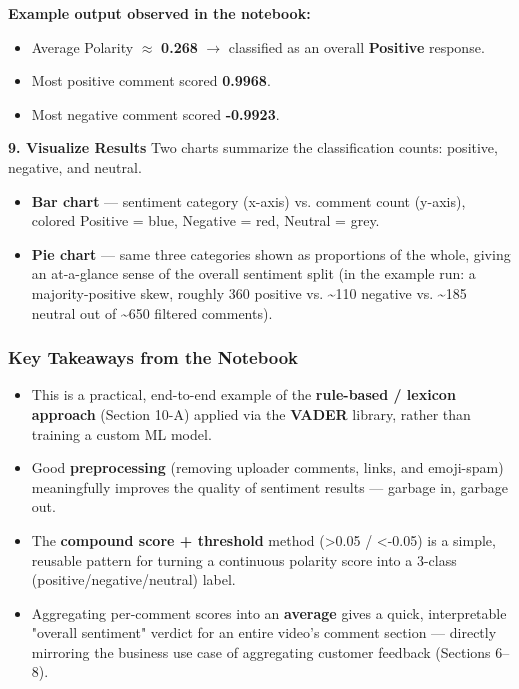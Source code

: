\documentclass[12pt,openany]{book}
\begin{document}
\textbf{Example output observed in the notebook:}
\begin{itemize}[leftmargin=*]
    \item Average Polarity \(\approx\) \textbf{0.268} \(\rightarrow\) classified as an overall \textbf{Positive} response.
    \item Most positive comment scored \textbf{0.9968}.
    \item Most negative comment scored \textbf{-0.9923}.
\end{itemize}

\textbf{9. Visualize Results}
Two charts summarize the classification counts: positive, negative, and neutral.
\begin{itemize}[leftmargin=*]
    \item \textbf{Bar chart} --- sentiment category (x-axis) vs. comment count (y-axis), colored Positive = blue, Negative = red, Neutral = grey.
    \item \textbf{Pie chart} --- same three categories shown as proportions of the whole, giving an at-a-glance sense of the overall sentiment split (in the example run: a majority-positive skew, roughly 360 positive vs. \textasciitilde{}110 negative vs. \textasciitilde{}185 neutral out of \textasciitilde{}650 filtered comments).
\end{itemize}

\subsubsection{Key Takeaways from the Notebook}

\begin{itemize}[leftmargin=*]
    \item This is a practical, end-to-end example of the \textbf{rule-based / lexicon approach} (Section 10-A) applied via the \textbf{VADER} library, rather than training a custom ML model.
    \item Good \textbf{preprocessing} (removing uploader comments, links, and emoji-spam) meaningfully improves the quality of sentiment results --- garbage in, garbage out.
    \item The \textbf{compound score + threshold} method (>0.05 / <-0.05) is a simple, reusable pattern for turning a continuous polarity score into a 3-class (positive/negative/neutral) label.
    \item Aggregating per-comment scores into an \textbf{average} gives a quick, interpretable "overall sentiment" verdict for an entire video's comment section --- directly mirroring the business use case of aggregating customer feedback (Sections 6--8).
\end{itemize}
\end{document}
